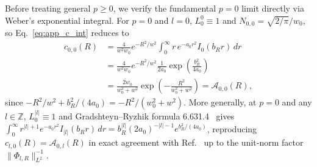 \documentclass[aps,pra,reprint,amsmath,amssymb,floatfix,longbibliography]{revtex4-2}
\providecommand{\abs}[1]{\lvert#1\rvert}
\providecommand{\norm}[1]{\lVert#1\rVert}
\begin{document}
Before treating general $p \ge 0$, we verify the fundamental $p = 0$ limit directly via Weber's exponential integral. For $p = 0$ and $l = 0$, $L_0^0 \equiv 1$ and $N_{0,0} = \sqrt{2/\pi}/w_0$, so Eq.~\eqref{eq:app_c_int} reduces to
\begin{align}
c_{0,0}(R) &= \frac{4}{w^2 w_0} e^{-R^2/w^2} \int_0^\infty r\,e^{-a_0 r^2} I_0(b_R r)\,dr \nonumber \\
&= \frac{4}{w^2 w_0} e^{-R^2/w^2} \frac{1}{2a_0} \exp\!\left(\frac{b_R^2}{4a_0}\right) \nonumber \\
&= \frac{2w_0}{w_0^2 + w^2} \exp\!\left(-\frac{R^2}{w_0^2 + w^2}\right) = \mathcal{A}_{0,0}(R),
\label{eq:app_p0_l0_check}
\end{align}
since $-R^2/w^2 + b_R^2/(4a_0) = -R^2/(w_0^2 + w^2)$. More generally, at $p = 0$ and any $l \in \mathbb{Z}$, $L_0^{\abs{l}} \equiv 1$ and Gradshteyn--Ryzhik formula 6.631.4~\cite{Gradshteyn2014} gives $\int_0^\infty r^{\abs{l}+1} e^{-a_0 r^2} I_{\abs{l}}(b_R r)\,dr = b_R^{\abs{l}} (2 a_0)^{-\abs{l}-1} e^{b_R^2/(4a_0)}$, reproducing $c_{l,0}(R) = \mathcal{A}_{0,l}(R)$ in exact agreement with Ref.~\cite{Ferreira2026} up to the unit-norm factor $\norm{\Phi_{l,R}}_{L^2}^{-1}$.
\end{document}
